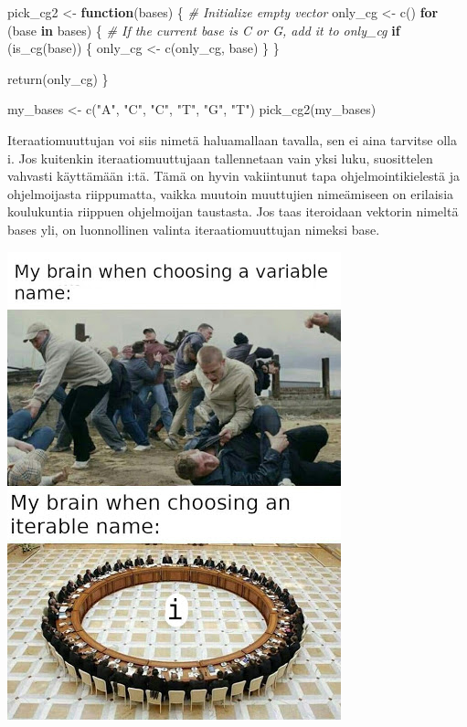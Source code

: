 \documentclass[
]{book}
\newenvironment{Shaded}{\begin{snugshade}}{\end{snugshade}}
\newcommand{\CommentTok}[1]{\textcolor[rgb]{0.56,0.35,0.01}{\textit{#1}}}
\newcommand{\ControlFlowTok}[1]{\textcolor[rgb]{0.13,0.29,0.53}{\textbf{#1}}}
\newcommand{\FunctionTok}[1]{\textcolor[rgb]{0.00,0.00,0.00}{#1}}
\newcommand{\NormalTok}[1]{#1}
\newcommand{\OtherTok}[1]{\textcolor[rgb]{0.56,0.35,0.01}{#1}}
\newcommand{\StringTok}[1]{\textcolor[rgb]{0.31,0.60,0.02}{#1}}
\begin{document}
\begin{Shaded}
\begin{Highlighting}[]
\NormalTok{pick\_cg2 }\OtherTok{\textless{}{-}} \ControlFlowTok{function}\NormalTok{(bases) \{}
  \CommentTok{\# Initialize empty vector}
\NormalTok{  only\_cg }\OtherTok{\textless{}{-}} \FunctionTok{c}\NormalTok{()}
  \ControlFlowTok{for}\NormalTok{ (base }\ControlFlowTok{in}\NormalTok{ bases) \{}
    \CommentTok{\# If the current base is C or G, add it to only\_cg}
    \ControlFlowTok{if}\NormalTok{ (}\FunctionTok{is\_cg}\NormalTok{(base)) \{}
\NormalTok{      only\_cg }\OtherTok{\textless{}{-}} \FunctionTok{c}\NormalTok{(only\_cg, base)}
\NormalTok{    \}}
\NormalTok{  \}}
  
  \FunctionTok{return}\NormalTok{(only\_cg)}
\NormalTok{\}}

\NormalTok{my\_bases }\OtherTok{\textless{}{-}} \FunctionTok{c}\NormalTok{(}\StringTok{"A"}\NormalTok{, }\StringTok{"C"}\NormalTok{, }\StringTok{"C"}\NormalTok{, }\StringTok{"T"}\NormalTok{, }\StringTok{"G"}\NormalTok{, }\StringTok{"T"}\NormalTok{)}
\FunctionTok{pick\_cg2}\NormalTok{(my\_bases)}
\end{Highlighting}
\end{Shaded}

Iteraatiomuuttujan voi siis nimetä haluamallaan tavalla, sen ei aina tarvitse olla i. Jos kuitenkin iteraatiomuuttujaan tallennetaan vain yksi luku, suosittelen vahvasti käyttämään i:tä. Tämä on hyvin vakiintunut tapa ohjelmointikielestä ja ohjelmoijasta riippumatta, vaikka muutoin muuttujien nimeämiseen on erilaisia koulukuntia riippuen ohjelmoijan taustasta. Jos taas iteroidaan vektorin nimeltä bases yli, on luonnollinen valinta iteraatiomuuttujan nimeksi base.

\includegraphics{files/08-functions/naming.jpg}
\end{document}
